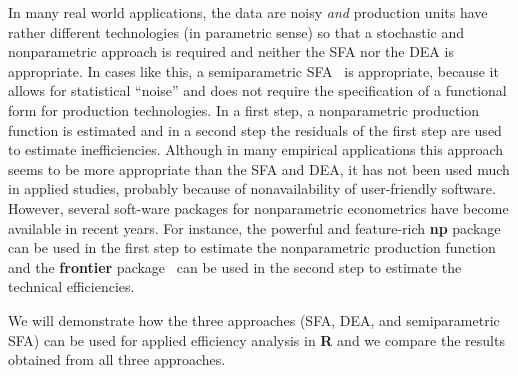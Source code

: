 \documentclass[10pt]{article}
\begin{document}
In many real world applications, the data are noisy \emph{and}
production units have rather different technologies (in parametric sense)
so that a stochastic and nonparametric approach is required
and neither the SFA nor the DEA is appropriate.
In cases like this,
a semiparametric SFA~\cite{fan96}
is appropriate,
because it allows for statistical ``noise''
and does not require the specification of a functional form
for production technologies.
In a first step, a nonparametric production function is estimated
and in a second step the residuals of the first step
are used to estimate inefficiencies.
Although in many empirical applications this approach seems to be
more appropriate than the SFA and DEA,
it has not been used much in applied studies,
probably because of nonavailability of user-friendly software.
However, several soft-ware packages for nonparametric econometrics
have become available in recent years.
For instance, the powerful and feature-rich \textbf{np} package~\cite{hayfield08}
can be used in the first step to estimate the nonparametric production function
and the \textbf{frontier} package~\cite{r-frontier-0.9}
can be used in the second step to estimate the technical efficiencies.

We will demonstrate how the three approaches (SFA, DEA, and semiparametric SFA)
can be used for applied efficiency analysis in \textbf{R}
and we compare the results obtained from all three approaches.



\end{document}
